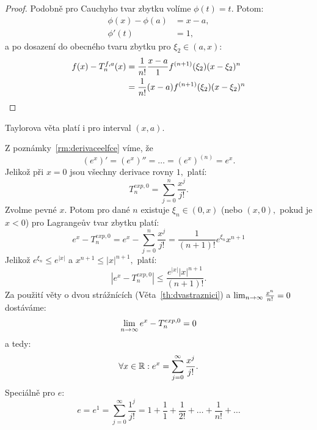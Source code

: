 \begin{proof}
    Podobně pro Cauchyho tvar zbytku volíme $\phi(t) = t.$ Potom:
    \begin{align*}
        \phi(x) - \phi(a) &= x-a, \\
        \phi'(t) &= 1, 
    \end{align*}
    a po dosazení do obecného tvaru zbytku pro $\xi_2 \in (a,x):$
    \begin{align*}
        f(x) - T_n^{f,a}(x) 
        &= \frac{1}{n!}\frac{x-a}{1}f^{(n+1)}(\xi_2)(x-\xi_2)^n \\
        &= \frac{1}{n!}(x-a)f^{(n+1)}(\xi_2)(x-\xi_2)^n 
    \end{align*}

\end{proof}

\begin{remark}
    Taylorova věta platí i pro interval $(x,a).$ 
\end{remark}

\begin{example}
    Z poznámky~\ref{rm:derivaceelfce} víme, že
    $$(e^x)' = (e^x)'' = \dots = (e^x)^{(n)} = e^x.$$
    Jelikož při $x=0$ jsou všechny derivace rovny $1,$ platí:
    $$T^{exp, 0}_n = \sum_{j=0}^n \frac{x^j}{j!}.$$
    Zvolme pevné $x.$ Potom pro dané $n$ existuje $\xi_n \in (0, x)$ (nebo $(x,0),$
    pokud je $x < 0$) \tz pro Lagrangeův tvar zbytku platí:
    $$e^x - T^{exp, 0}_n =e^x - \sum_{j=0}^n \frac{x^j}{j!} 
    = \frac{1}{(n+1)!}e^{\xi_n}x^{n+1}$$
    Jelikož $e^{\xi_n} \leq e^{|x|}$ a $x^{n+1} \leq |x|^{n+1},$ platí:
    $$|e^x - T^{exp, 0}_n| \leq \frac{e^{|x|}|x|^{n+1}}{(n+1)!}.$$
    Za použití věty o dvou strážnících (Věta~\ref{th:dvastraznici}) a 
    $\lim_{n \to \infty} \frac{x^n}{n!} = 0$ dostáváme:
    $$\lim_{n \to \infty} e^x - T^{exp, 0}_n = 0$$
    a tedy:
    $$\forall x \in \mathbb{R}: e^x = \sum_{j=0}^\infty \frac{x^j}{j!}.$$
    Speciálně pro $e:$
    $$e = e^1 = \sum_{j=0}^\infty \frac{1^j}{j!}= 1 + \frac{1}{1} + \frac{1}{2!}
    + \dots + \frac{1}{n!} + \dots$$
\end{example}

